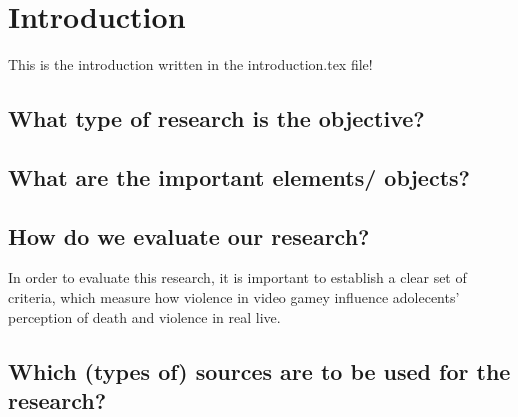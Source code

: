 \section{Introduction}
This is the introduction written in the introduction.tex file!

\subsection{What type of research is the objective?}

\subsection{What are the important elements/ objects?}

\subsection{How do we evaluate our research?}

In order to evaluate this research, it is important to establish a clear set of criteria, which measure how violence in video gamey influence adolecents' perception of death and violence in real live.


\subsection{Which (types of) sources are to be used for the research?}